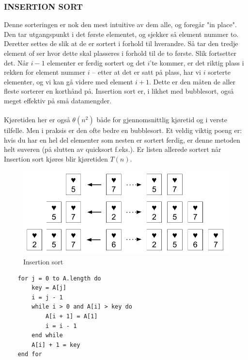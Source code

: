 \subsubsection{INSERTION SORT}
Denne sorteringen er nok den mest intuitive av dem alle, og foregår "in place". Den tar utgangspunkt i det første elementet, og sjekker så element nummer to. Deretter settes de slik at de er sortert i forhold til hverandre. Så tar den tredje element of ser hvor dette skal plasseres i forhold til de to første. Slik fortsetter det. Når $i - 1$ elementer er ferdig sortert og det $i$'te kommer, er det riktig plass i rekken for element nummer $i$ – etter at det er satt på plass, har vi $i$ sorterte elementer, og vi kan gå videre med element $i + 1$. Dette er den måten de aller fleste sorterer en korthånd på. Insertion sort er, i likhet med bubblesort, også meget effektiv på små datamengder. 
\\\\
Kjøretiden her er også \textbf{$\theta(n^2)$} både for gjennomsnittlig kjøretid og i verste tilfelle. Men i praksis er den ofte bedre en bubblesort. Et veldig viktig poeng er: hvis du har en hel del elementer som nesten er sortert ferdig, er denne metoden helt suveren (på slutten av quicksort f.eks.). Er listen allerede sortert når Insertion sort kjøres blir kjøretiden $T(n)$.

\begin{figure}[H]
\includegraphics[scale=0.5]{images/insertionsort}
\centering %
\caption{Insertion sort}
\label{fig:insertionsort}
\end{figure}

\begin{lstlisting}
    for j = 0 to A.length do
	    key = A[j]
	    i = j - 1
	    while i > 0 and A[i] > key do
	    	A[i + 1] = A[1]
	    	i = i - 1
	    end while
	    A[i] + 1 = key
    end for
\end{lstlisting}

